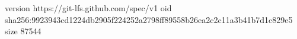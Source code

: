version https://git-lfs.github.com/spec/v1
oid sha256:9923943cd1224db2905f224252a2798ff89558b26ea2c2c11a3b41b7d1c829e5
size 87544
